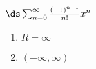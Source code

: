 {$\ds\sum_{n=0}^\infty \frac{(-1)^{n+1}}{n!}x^{n}$
}
{\begin{enumerate}
	\item $R=\infty$
	\item	$(-\infty,\infty)$
\end{enumerate}
}